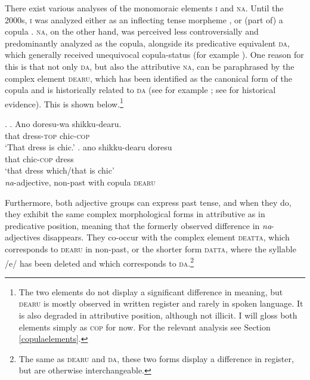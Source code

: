 There exist various analyses of the monomoraic elements \textsc{i} and \textsc{na}. Until the 2000s, \textsc{i} was analyzed either as an inflecting tense morpheme \citep{teramura:1982:nihongo, murasugi:1991:noun, urushibara:1993:syntactic, uehara:1998:syntactic}, or (part of) a copula \citep{kubo:1992:japanese}. \textsc{na}, on the other hand, was perceived less controversially and predominantly analyzed as the copula, alongside its predicative equivalent \textsc{da}, which generally received unequivocal copula-status (for example \citealt{urushibara:1993:syntactic, nishiyama:1999:adj}). One reason for this is that not only \textsc{da}, but also the attributive \textsc{na}, can be paraphrased by the complex element \textsc{dearu}, which has been identified as the canonical form of the copula and is historically related to \textsc{da} (see for example \citealt{urushibara:1993:syntactic, nishiyama:1999:adj, nakahara:2002:japanese}; see \citealt{miyama:2011:da} for historical evidence). This is shown below.\footnote{The two elements do not display a significant difference in meaning, but \textsc{dearu} is mostly observed in written register and rarely in spoken language. It is also degraded in attributive position, although not illicit. I will gloss both elements simply as \textsc{cop} for now. For the relevant analysis see Section \ref{copulaelements}.}

\ex. \label{na-A de aru} \ag. Ano doresu-wa shikku-dearu.\\
that dress-\textsc{top} chic-\textsc{cop}\\
`That dress is chic.'
\bg. ano shikku-dearu doresu\\
that chic-\textsc{cop} dress\\
`that dress which/that is chic' \\ \null \hfill \textit{na}-adjective, non-past with copula \textsc{dearu}

\largerpage
Furthermore, both adjective groups can express past tense, and when they do, they exhibit the same complex morphological forms in attributive as in predicative position, meaning that the formerly observed difference in \textit{na}-adjectives disappears. They co-occur with the complex element \textsc{deatta}, which corresponds to \textsc{dearu} in non-past, or the shorter form \textsc{datta}, where the syllable /e/ has been deleted and which corresponds to \textsc{da}.\footnote{The same as \textsc{dearu} and \textsc{da}, these two forms display a difference in register, but are otherwise interchangeable.}

